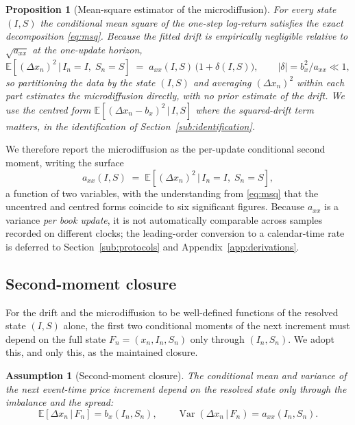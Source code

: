 \documentclass[11pt]{article}
\theoremstyle{plain}
\newtheorem{assumption}{Assumption}
\newtheorem{proposition}{Proposition}
\theoremstyle{definition}
\newcommand{\E}{\mathbb{E}}
\newcommand{\Var}{\operatorname{Var}}
\newcommand{\given}{\,\vert\,}
\newcommand{\axx}{a_{xx}}
\begin{document}
\begin{proposition}[Mean-square estimator of the microdiffusion]
\label{prop:estimator}
For every state $(I,S)$ the conditional mean square of the one-step log-return
satisfies the exact decomposition \eqref{eq:msq}. Because the fitted drift is
empirically negligible relative to $\sqrt{\axx}$ at the one-update horizon,
\begin{equation}
  \E\!\left[(\Delta x_n)^2 \given I_n=I,\; S_n=S\right]
  \;=\; \axx(I,S)\,\bigl(1 + \delta(I,S)\bigr),
  \qquad |\delta| = b_x^2/\axx \ll 1,
  \label{eq:prop-est}
\end{equation}
so partitioning the data by the state $(I,S)$ and averaging $(\Delta x_n)^2$ within
each part estimates the microdiffusion directly, with no prior estimate of the drift.
We use the centred form $\E[(\Delta x_n-b_x)^2\given I,S]$ where the squared-drift term
matters, in the identification of Section~\ref{sub:identification}.
\end{proposition}

\noindent
We therefore report the microdiffusion as the per-update conditional second moment,
writing the surface
\begin{equation}
  \axx(I,S) \;=\; \E\!\left[(\Delta x_n)^2 \given I_n=I,\; S_n=S\right],
  \label{eq:axx-surface}
\end{equation}
a function of two variables, with the understanding from \eqref{eq:msq} that the
uncentred and centred forms coincide to six significant figures. Because $\axx$ is a
variance \emph{per book update}, it is not automatically comparable across samples
recorded on different clocks; the leading-order conversion to a calendar-time rate is
deferred to Section~\ref{sub:protocols} and Appendix~\ref{app:derivations}.

\subsection{Second-moment closure}
\label{sub:decomp}

For the drift and the microdiffusion to be well-defined functions of the resolved
state $(I,S)$ alone, the first two conditional moments of the next increment must
depend on the full state $F_n=(x_n,I_n,S_n)$ only through $(I_n,S_n)$. We adopt
this, and only this, as the maintained closure.

\begin{assumption}[Second-moment closure]
\label{ass:closure}
The conditional mean and variance of the next event-time price increment depend on the
resolved state only through the imbalance and the spread:
\begin{equation}
  \E\!\left[\Delta x_n \given F_n\right] = b_x(I_n,S_n),
  \qquad
  \Var\!\left(\Delta x_n \given F_n\right) = \axx(I_n,S_n).
  \label{eq:closure}
\end{equation}
\end{assumption}
\end{document}
